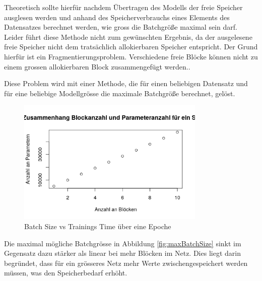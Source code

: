 Theoretisch sollte hierfür nachdem Übertragen des Modells der freie Speicher ausglesen werden und anhand des Speicherverbrauchs eines Elements des Datensatzes berechnet werden, wie gross die Batchgröße maximal sein darf. Leider führt diese Methode nicht zum gewünschten Ergebnis, da der ausgelesene freie Speicher nicht dem tratsächlich allokierbaren Speicher entspricht.
Der Grund hierfür ist ein Fragmentierungsproblem. Verschiedene freie Blöcke können nicht zu einem grossen allokierbaren Block zusammengefügt werden.. 

Diese Problem wird mit einer Methode, die für einen beliebigen Datensatz und für eine beliebige Modellgrösse die maximale Batchgröße berechnet, gelöst. 





\begin{figure}[h]
 \centering
 \includegraphics[width=0.8\textwidth]{KapitelPartB/Images/linearBlocks.png}
 \caption{Batch Size vs Trainings Time über eine Epoche}
 \label{fig:linearBlocks}
\end{figure}




Die maximal mögliche Batchgrösse in Abbildung \ref{fig:maxBatchSize} sinkt im Gegensatz dazu stärker als linear bei mehr Blöcken im Netz. Dies liegt darin begründet, dass für ein grösseres Netz mehr Werte zwischengespeichert werden müssen, was den Speicherbedarf erhöht.

